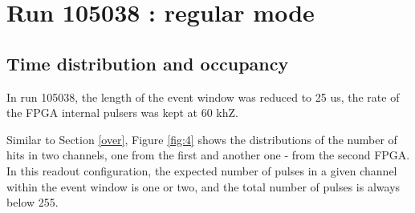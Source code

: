 

\section{Run 105038 : regular mode }

\subsection{Time distribution and occupancy}
In run 105038, the length of the event window was reduced to 25 us,
the rate of the FPGA internal pulsers was kept at 60 khZ. 

Similar to Section \ref{over}, Figure \ref{fig:4} shows the distributions
of the number of hits in two channels, one from the 
first and another one - from the second FPGA. 
In this readout configuration, the expected number of pulses in a given channel
within the event window is one or two, and the total number of pulses is always below 255.

